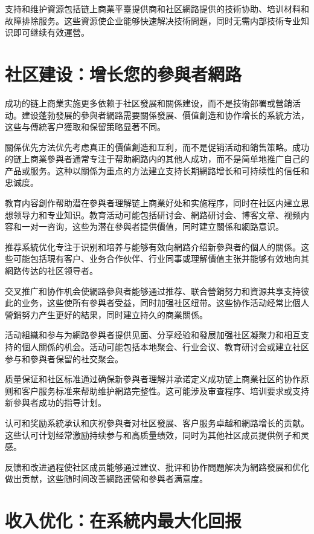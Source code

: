 \documentclass[
  Letterpaper,
]{scrbook}
\begin{document}
支持和维护資源包括链上商業平臺提供商和社区網路提供的技術协助、培训材料和故障排除服务。这些資源使企业能够快速解决技術問題，同时无需内部技術专业知识即可继续有效運營。

\section{社区建设：增长您的參與者網路}\label{ux793eux533aux5efaux8bbeux589eux957fux60a8ux7684ux53c3ux8207ux8005ux7db2ux8def}

成功的链上商業实施更多依赖于社区發展和關係建设，而不是技術部署或營銷活动。建设蓬勃發展的參與者網路需要關係發展、價值創造和协作增长的系統方法，这些与傳統客户獲取和保留策略显著不同。

關係优先方法优先考虑真正的價值創造和互利，而不是促销活动和銷售策略。成功的链上商業參與者通常专注于帮助網路内的其他人成功，而不是简单地推广自己的产品或服务。这种以關係为重点的方法建立支持长期網路增长和可持续性的信任和忠诚度。

教育内容創作帮助潜在參與者理解链上商業好处和实施程序，同时在社区内建立思想领导力和专业知识。教育活动可能包括研讨会、網路研讨会、博客文章、视频内容和一对一咨询，这些为潜在參與者提供價值，同时建立關係和網路意识。

推荐系統优化专注于识别和培养与能够有效向網路介绍新參與者的個人的關係。这些可能包括現有客户、业务合作伙伴、行业同事或理解價值主张并能够有效地向其網路传达的社区领导者。

交叉推广和协作机会使網路參與者能够通过推荐、联合營銷努力和資源共享支持彼此的业务，这些使所有參與者受益，同时加强社区纽带。这些协作活动经常比個人營銷努力产生更好的結果，同时建立持久的商業關係。

活动組織和参与为網路參與者提供见面、分享经验和發展加强社区凝聚力和相互支持的個人關係的机会。活动可能包括本地聚会、行业会议、教育研讨会或建立社区参与和參與者保留的社交聚会。

质量保证和社区标准通过确保新參與者理解并承诺定义成功链上商業社区的协作原则和客户服务标准来帮助维护網路完整性。这可能涉及审查程序、培训要求或支持新參與者成功的指导计划。

认可和奖励系統承认和庆祝參與者对社区發展、客户服务卓越和網路增长的贡献。这些认可计划经常激励持续参与和高质量绩效，同时为其他社区成员提供例子和灵感。

反馈和改进過程使社区成员能够通过建议、批评和协作問題解决为網路發展和优化做出贡献，这些随时间改善網路運營和參與者满意度。

\section{收入优化：在系統内最大化回报}\label{ux6536ux5165ux4f18ux5316ux5728ux7cfbux7d71ux5185ux6700ux5927ux5316ux56deux62a5}
\end{document}
